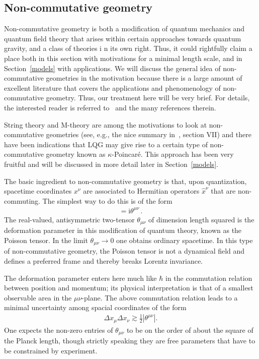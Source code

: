 \documentclass{article}
\def\beqn{\begin{eqnarray}}
\def\eeqn{\end{eqnarray}}
\begin{document}
\subsection{Non-commutative geometry}
\label{ncg} 

Non-commutative geometry is both a modification of quantum mechanics and quantum field theory that arises within 
certain approaches towards quantum gravity, and a class of theories i n its own right. Thus, it 
could rightfully claim a place both in this section with motivations for a minimal length scale, and in Section~\ref{models} 
with applications. We will discuss the general idea of 
non-commutative geometries in the motivation because
there is a large amount of excellent literature that covers the applications and 
phenomenology of non-commutative geometry. Thus, our treatment here will be very brief.
For details, the interested reader is referred to~\cite{Douglas:2001ba,Hinchliffe:2002km}
and the many references therein. 

String theory and M-theory are among the motivations to look at non-commutative geometries 
(see, e.g., the nice summary in~\cite{Douglas:2001ba}, section VII) and there have been indications that LQG may give rise to a certain type
of non-commutative geometry known as $\kappa$-Poincar\'e. This approach has been very fruitful
and will be discussed in more detail later
in Section~\ref{models}. 

The basic ingredient to non-commutative geometry is that, upon quantization, spacetime
coordinates $x^\nu$ are associated to Hermitian operators $\hat x^\nu$ that are non-commuting.
The simplest way to do this is of the form
\beqn
[\hat x^\nu, \hat x^\mu] = \mathrm{i} \theta^{\mu \nu} \,.
\eeqn
The real-valued, antisymmetric two-tensor $\theta_{\mu \nu}$ of dimension length squared is the deformation parameter 
in this modification of quantum theory, known as the Poisson tensor. In the limit $\theta_{\mu \nu} \to 0$ one
obtains ordinary spacetime. In this type of non-commutative geometry, the Poisson tensor is not a dynamical field and
defines a preferred frame and thereby breaks Lorentz invariance.

The deformation parameter enters here much like $\hbar$ in the commutation
relation between
position and momentum; its physical interpretation is that of a smallest observable area in the $\mu\nu$-plane. 
 The above commutation relation leads to a
minimal uncertainty among spacial coordinates of the form
\beqn
\Delta x_\mu \Delta x_\nu \gtrsim \frac{1}{2} |\theta^{\mu \nu} | .
\eeqn
One expects the non-zero entries of $\theta_{\mu\nu}$ to be on the order of about the square of the Planck length,
though strictly speaking they are free parameters that have to be constrained by experiment. 
\end{document}

